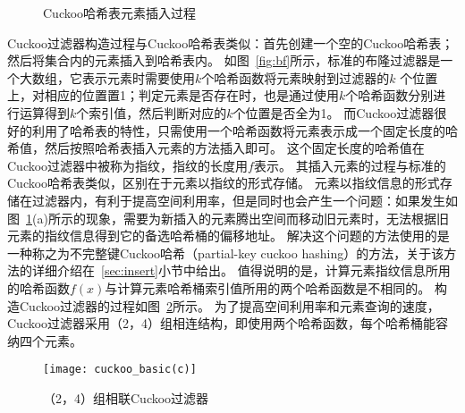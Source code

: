 \begin{figure}[htbp]
\centering
\caption{Cuckoo哈希表元素插入过程}
\label{fig:cuckoo_basic}
\end{figure}

Cuckoo过滤器构造过程与Cuckoo哈希表类似：首先创建一个空的Cuckoo哈希表；然后将集合内的元素插入到哈希表内。
如图~\ref{fig:bf}所示，标准的布隆过滤器是一个大数组，它表示元素时需要使用$k$个哈希函数将元素映射到过滤器的$k$
个位置上，对相应的位置置1；判定元素是否存在时，也是通过使用$k$个哈希函数分别进行运算得到$k$个索引值，然后判断对应的$k$个位置是否全为1。
而Cuckoo过滤器很好的利用了哈希表的特性，只需使用一个哈希函数将元素表示成一个固定长度的哈希值，然后按照哈希表插入元素的方法插入即可。
这个固定长度的哈希值在Cuckoo过滤器中被称为指纹，指纹的长度用$f$表示。
其插入元素的过程与标准的Cuckoo哈希表类似，区别在于元素以指纹的形式存储。
元素以指纹信息的形式存储在过滤器内，有利于提高空间利用率，但是同时也会产生一个问题：如果发生如图~\ref{fig:cuckoo_basic}(a)所示的现象，需要为新插入的元素腾出空间而移动旧元素时，无法根据旧元素的指纹信息得到它的备选哈希桶的偏移地址。
解决这个问题的方法使用的是一种称之为不完整键Cuckoo哈希（partial-key cuckoo hashing）的方法，关于该方法的详细介绍在~\ref{sec:insert}小节中给出。
值得说明的是，计算元素指纹信息所用的哈希函数$f(x)$与计算元素哈希桶索引值所用的两个哈希函数是不相同的。
构造Cuckoo过滤器的过程如图~\ref{fig:cf_construct}所示。
为了提高空间利用率和元素查询的速度，Cuckoo过滤器采用（2，4）组相连结构，即使用两个哈希函数，每个哈希桶能容纳四个元素。


\begin{figure}[htbp]
\centering
\texttt{[image: cuckoo\_basic(c)]}
\caption{（2，4）组相联Cuckoo过滤器}\label{fig:cf_construct}
\end{figure}

